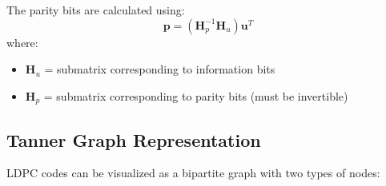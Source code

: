 The parity bits are calculated using:
\begin{equation}
\mathbf{p} = (\mathbf{H}_p^{-1} \mathbf{H}_u) \mathbf{u}^T
\end{equation}
where:
\begin{itemize}
\item $\mathbf{H}_u$ = submatrix corresponding to information bits
\item $\mathbf{H}_p$ = submatrix corresponding to parity bits (must be invertible)
\end{itemize}

\subsection{Tanner Graph Representation}

LDPC codes can be visualized as a bipartite graph with two types of nodes:

